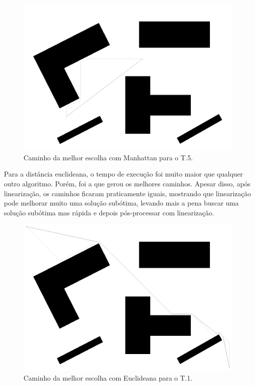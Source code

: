 \documentclass[12pt]{article}
\theoremstyle{plain}
\numberwithin{equation}{section}
\begin{document}
\begin{figure}[H]
  \centering\includegraphics[scale=0.4]{imgs/best_choice_manhattan_5.png}
  \caption{Caminho da melhor escolha com Manhattan para o T.5.}
\end{figure}

Para a distância euclideana, o tempo de execução foi muito maior que qualquer outro algoritmo.
Porém, foi a que gerou os melhores caminhos. Apesar disso, após linearização, os caminhos ficaram
praticamente iguais, mostrando que linearização pode melhorar muito uma solução subótima, levando
mais a pena buscar uma solução subótima mas rápida e depois pós-processar com linearização.

\begin{figure}[H]
  \centering\includegraphics[scale=0.4]{imgs/best_choice_euclidean_1.png}
  \caption{Caminho da melhor escolha com Euclideana para o T.1.}
\end{figure}
\end{document}
